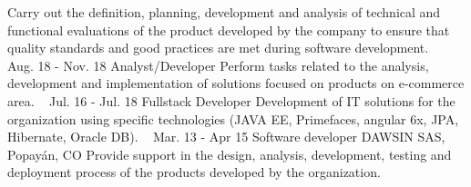 \documentclass[american]{cv-class}
\begin{document}
\begin{entrylist}
	{\justifying Carry out the definition, planning, development and analysis of technical and functional evaluations of the product developed by the company to ensure that quality standards and good practices are met during software development.}
	~ 
    \entry
	{Aug. 18 - Nov. 18}
	{Analyst/Developer}
	{\href{http://www.serviciosenweb.com/}{ }}
	{\justifying Perform tasks related to the analysis, development and implementation of solutions focused on products on e-commerce area.}
	~ 
    \entry
	{Jul. 16 - Jul. 18}
	{Fullstack Developer}
	{\href{https://sitis.com.co/}{ }}
	{\justifying Development of IT solutions for the organization using specific technologies (JAVA EE, Primefaces, angular 6x, JPA, Hibernate, Oracle DB).}
	~ 
    \entry
	{Mar. 13 - Apr 15}
	{Software developer}
	{DAWSIN SAS, Popayán, CO}
	{\justifying Provide support in the design, analysis, development, testing and deployment process of the products developed by the organization.}
\end{entrylist}
\end{document}
